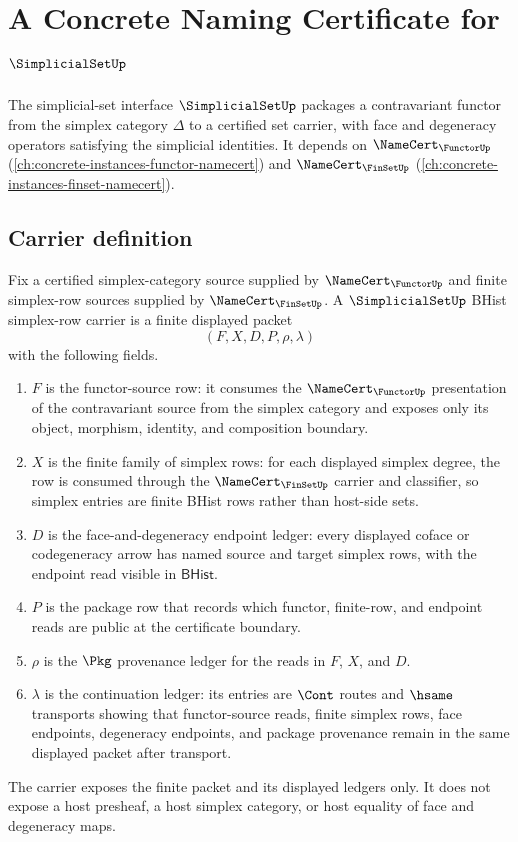 \chapter{A Concrete Naming Certificate for $\SimplicialSetUp$}
\label{ch:concrete-instances-simplicialset-namecert}

The simplicial-set interface $\SimplicialSetUp$ packages a contravariant functor from the simplex category $\Delta$ to a certified set carrier, with face and degeneracy operators satisfying the simplicial identities. It depends on $\NameCert_{\FunctorUp}$ (\autoref{ch:concrete-instances-functor-namecert}) and $\NameCert_{\FinSetUp}$ (\autoref{ch:concrete-instances-finset-namecert}).

\section{Carrier definition}
\label{sec:simplicialset-carrier}

\begin{definition}
\label{def:simplicialset-bhist-simplex-row-carrier}
Fix a certified simplex-category source supplied by $\NameCert_{\FunctorUp}$ and finite simplex-row sources supplied by $\NameCert_{\FinSetUp}$. A $\SimplicialSetUp$ BHist simplex-row carrier is a finite displayed packet
$$
(F,X,D,P,\rho,\lambda)
$$
with the following fields.
\begin{enumerate}
\item $F$ is the functor-source row: it consumes the $\NameCert_{\FunctorUp}$ presentation of the contravariant source from the simplex category and exposes only its object, morphism, identity, and composition boundary.
\item $X$ is the finite family of simplex rows: for each displayed simplex degree, the row is consumed through the $\NameCert_{\FinSetUp}$ carrier and classifier, so simplex entries are finite BHist rows rather than host-side sets.
\item $D$ is the face-and-degeneracy endpoint ledger: every displayed coface or codegeneracy arrow has named source and target simplex rows, with the endpoint read visible in $\mathsf{BHist}$.
\item $P$ is the package row that records which functor, finite-row, and endpoint reads are public at the certificate boundary.
\item $\rho$ is the $\Pkg$ provenance ledger for the reads in $F$, $X$, and $D$.
\item $\lambda$ is the continuation ledger: its entries are $\Cont$ routes and $\hsame$ transports showing that functor-source reads, finite simplex rows, face endpoints, degeneracy endpoints, and package provenance remain in the same displayed packet after transport.
\end{enumerate}
The carrier exposes the finite packet and its displayed ledgers only. It does not expose a host presheaf, a host simplex category, or host equality of face and degeneracy maps.
\end{definition}

